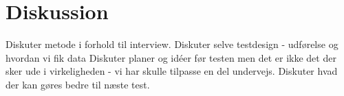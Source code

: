 \chapter{Diskussion}
\label{ParametreDiskussion}
%
Diskuter metode i forhold til interview. 
Diskuter selve testdesign - udførelse og hvordan vi fik data
Diskuter planer og idéer før testen men det er ikke det der sker ude i virkeligheden - vi har skulle tilpasse en del undervejs. 
Diskuter hvad der kan gøres bedre til næste test. 